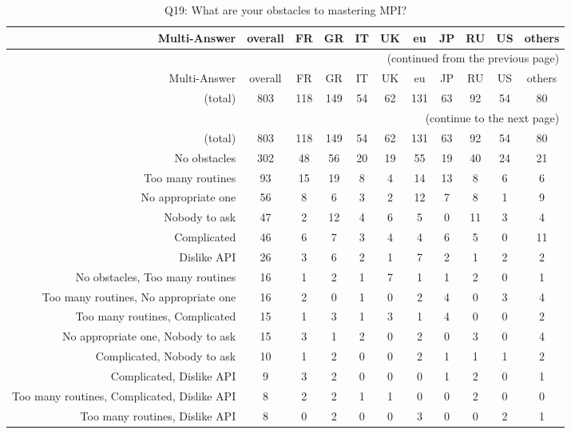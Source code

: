 \clearpage%
{\footnotesize\begin{landscape}%
\begin{longtable}[htb]{r|c|c|c|c|c|c|c|c|c|c}%
\caption{Q19: What are your obstacles to mastering MPI?}%
\label{tab:Q19-mans} \\%
\hline%
Multi-Answer & overall & FR & GR & IT & UK & eu & JP & RU & US & others \\
 \hline%
\endfirsthead%
\multicolumn{11}{r}{(continued from the previous page)}\\%
\hline%
Multi-Answer & overall & FR & GR & IT & UK & eu & JP & RU & US & others \\
 \hline%
\endhead%
\hline%
(total) & 803 & 118 & 149 & 54 & 62 & 131 & 63 & 92 & 54 & 80 \\%
\hline%
\multicolumn{11}{r}{(continue to the next page)}\\%
\endfoot%
\hline%
(total) & 803 & 118 & 149 & 54 & 62 & 131 & 63 & 92 & 54 & 80 \\%
\hline%
\endlastfoot%
\hline%
{No obstacles} & 302 & 48 & 56 & 20 & 19 & 55 & 19 & 40 & 24 & 21 \\%
{Too many routines} & 93 & 15 & 19 & 8 & 4 & 14 & 13 & 8 & 6 & 6 \\%
{No appropriate one} & 56 & 8 & 6 & 3 & 2 & 12 & 7 & 8 & 1 & 9 \\%
{Nobody to ask} & 47 & 2 & 12 & 4 & 6 & 5 & 0 & 11 & 3 & 4 \\%
{Complicated} & 46 & 6 & 7 & 3 & 4 & 4 & 6 & 5 & 0 & 11 \\%
{Dislike API} & 26 & 3 & 6 & 2 & 1 & 7 & 2 & 1 & 2 & 2 \\%
{No obstacles, Too many routines} & 16 & 1 & 2 & 1 & 7 & 1 & 1 & 2 & 0 & 1 \\%
{Too many routines, No appropriate one} & 16 & 2 & 0 & 1 & 0 & 2 & 4 & 0 & 3 & 4 \\%
{Too many routines, Complicated} & 15 & 1 & 3 & 1 & 3 & 1 & 4 & 0 & 0 & 2 \\%
{No appropriate one, Nobody to ask} & 15 & 3 & 1 & 2 & 0 & 2 & 0 & 3 & 0 & 4 \\%
{Complicated, Nobody to ask} & 10 & 1 & 2 & 0 & 0 & 2 & 1 & 1 & 1 & 2 \\%
{Complicated, Dislike API} & 9 & 3 & 2 & 0 & 0 & 0 & 1 & 2 & 0 & 1 \\%
{Too many routines, Complicated, Dislike API} & 8 & 2 & 2 & 1 & 1 & 0 & 0 & 2 & 0 & 0 \\%
{Too many routines, Dislike API} & 8 & 0 & 2 & 0 & 0 & 3 & 0 & 0 & 2 & 1 \\%

\end{longtable}
\end{landscape}}

